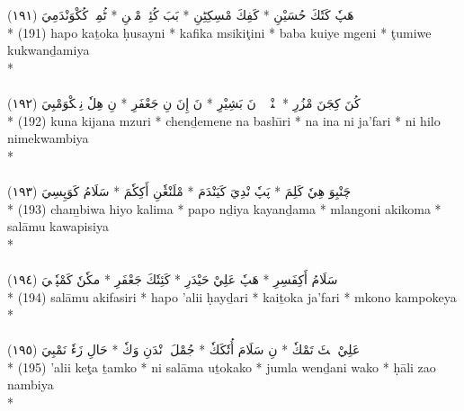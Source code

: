 \documentclass[a4paper, 12pt]{report}
\begin{document}
\begin{center}
\textarabic{(١٩١) \textcolor{mygreen}{هَپٗ كَتٗكَ حُسَيْنِ  * كَفِكَ مْسِكِٹِنِ  * بَبَ كُئِيٖ مْڠٖنِ  * ٹُمِوٖ كُكْوَنْدَمِيَ }} \\* 
(191) hapo kaṯoka ḥusayni  * kafika msikiţini  * baba kuiye mgeni  * ţumiwe kukwanḏamiya  \\* 
 \\ 
\\[8mm] 

\textarabic{(١٩٢) \textcolor{mygreen}{كُنَ كِجَنَ مْزُرِ  * چٖنْدٖمٖنٖ نَ بَشِيْرِ  * نَ إِنَ نِ جَعْفَرِ  * نِ هِلٗ نِمٖكْوَمْبِيَ }} \\* 
(192) kuna kijana mzuri  * chenḏemene na bashı̄ri  * na ina ni ja'fari  * ni hilo nimekwambiya  \\* 
 \\ 
\\[8mm] 

\textarabic{(١٩٣) \textcolor{mygreen}{چَنْبِوَ هِيٗ كَلِمَ  * پَپٗ نْدِيَ كَيَنْدَمَ  * مْلَنْڠٗنِ أَكِكٗمَ  * سَلَامُ كَوَپِسِيَ }} \\* 
(193) cham̱biwa hiyo kalima  * papo nḏiya kayanḏama  * mlangoni akikoma  * salāmu kawapisiya  \\* 
 \\ 
\\[8mm] 

\textarabic{(١٩٤) \textcolor{mygreen}{سَلَامُ أَكِفَسِرِ  * هَپٗ عَلِيْ حَيْدَرِ  * كَئِتٗكَ جَعْفَرِ  * مكٗنٗ كَمْپٗكٖيَ }} \\* 
(194) salāmu akifasiri  * hapo 'alii ḥayḏari  * kaiṯoka ja'fari  * mkono kampokeya  \\* 
 \\ 
\\[8mm] 

\textarabic{(١٩٥) \textcolor{mygreen}{عَلِيْ كٖٹَ تَمْكٗ  * نِ سَلَامَ أُتٗكَكٗ  * جُمْلَ وٖنْدَنِ وَكٗ  * حَالِ زَءٗ نَمْبِيَ }} \\* 
(195) 'alii keţa ṯamko  * ni salāma uṯokako  * jumla wenḏani wako  * ḥāli zao nambiya  \\* 
 \\ 
\\[8mm] 


\end{center}
\end{document}
